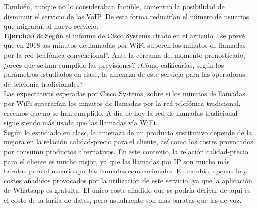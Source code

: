 \documentclass[11pt]{article}
\theoremstyle{plain}
\theoremstyle{definition}
\begin{document}
También, aunque no lo consideraban factible, comentan la posibilidad
de disminuir el servicio de las VoIP. De esta forma reducirían el
número de usuarios que migraran al nuevo servicio.\\

\textbf{Ejercicio 3:} Según el informe de Cisco Systems citado en el
artículo, ``se prevé que en 2018 los minutos de llamadas por WiFi
superen los minutos de llamadas por la red telefónica
convencional''. Ante la cercanía del momento pronosticado, ¿crees que
se han cumplido las previsiones? ¿Cómo calificarías, según los
parámetros estudiados en clase, la amenaza de este servicio para las
operadoras de telefonía tradicionales?\\

Las expectativas esperadas por Cisco Systems, sobre si los minutos de
llamadas por WiFi superarían los minutos de llamadas por la red
telefónica tradicional, creemos que no se han cumplido. A día de hoy
la red de llamadas tradicional sigue siendo más usada que las llamadas
vía WiFi.\\

Según lo estudiado en clase, la amenaza de un producto sustitutivo
depende de la mejora en la relación calidad-precio para el cliente,
así como los costes provocados por consumir productos alternativos.
En este contexto, la relación calidad-precio para el cliente es mucho
mejor, ya que las llamadas por IP son mucho más baratas para el
usuario que las llamadas convencionales. En cambio, apenas hay costes
añadidos provocados por la utilización de este servicio, ya que la
aplicación de Whatsapp es gratuita. El único coste añadido que se
podría derivar de aquí es el coste de la tarifa de datos, pero
usualmente son más baratas que las de voz.
\end{document}
